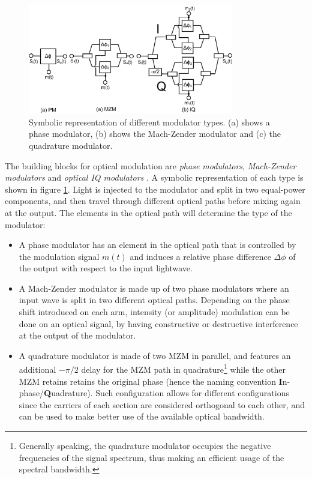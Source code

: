 \begin{figure}[!ht]
\centering
  \includegraphics[width=0.8\textwidth]{visio/PM_MZM_IQ}
  \caption{Symbolic representation of different modulator types. (a) shows a phase modulator, (b) shows the Mach-Zender modulator and (c) the quadrature modulator.}
  \label{fig:mods}
\end{figure}

The building blocks for optical modulation are \emph{phase modulators}, \emph{Mach-Zender modulators} and \emph{optical IQ modulators} \cite{SeimetzMod06}. A symbolic representation of each type is shown in figure \ref{fig:mods}. Light is injected to the modulator and split in two equal-power components, and then travel through different optical paths before mixing again at the output. The elements in the optical path will determine the type of the modulator:
\begin{itemize}
\item A phase modulator has an element in the optical path that is controlled by the modulation signal $m(t)$ and induces a relative phase difference $\Delta \phi$ of the output with respect to the input lightwave.
\item A Mach-Zender modulator is made up of two phase modulators where an input wave is split in two different optical paths. Depending on the phase shift introduced on each arm, intensity (or amplitude) modulation can be done on an optical signal, by having constructive or destructive interference at the output of the modulator.
\item A quadrature modulator is made of two MZM in parallel, and features an additional $-\pi/2$ delay for the MZM path in quadrature\footnote{Generally speaking, the quadrature modulator occupies the negative frequencies of the signal spectrum, thus making an efficient usage of the spectral bandwidth.} while the other MZM retains retains the original phase (hence the naming convention \textbf{I}n-phase/\textbf{Q}uadrature). Such configuration allows for different configurations since the carriers of each section are considered orthogonal to each other, and can be used to make better use of the available optical bandwidth.
\end{itemize}

